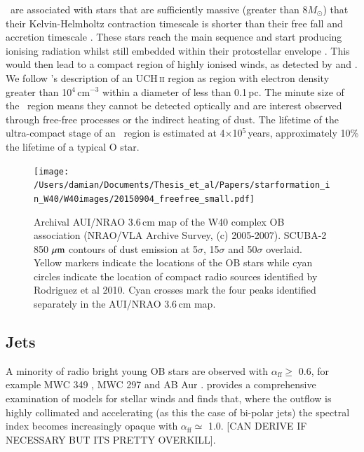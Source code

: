 \UCHII\ are associated with stars that are sufficiently massive (greater than 8$M_{\mathrm{\odot}}$) that their Kelvin-Helmholtz contraction timescale is shorter than their free fall and accretion timescale \citep{Manoj:2007ly}. These stars reach the main sequence and start producing ionising radiation whilst still embedded within their protostellar envelope \citep{McKee:2003ys}. This would then lead to a compact region of highly ionised winds, as detected by \cite{Malbet:2007zr} and \cite{Drew:1997qf}. We follow \cite{Wood:1989bh}'s description of an UCH\,\textsc{ii} region as region with electron density greater than 10$^{4}$\,cm$^{-3}$ within a diameter of less than 0.1\,pc. The minute size of the \UCHII\ region means they cannot be detected optically and are interest observed through free-free processes or the indirect heating of dust. The lifetime of the ultra-compact stage of an \HII\ region is estimated at 4$\times$10$^{5}$\,years, approximately 10\% the lifetime of a typical O star. 

\begin{figure}
\begin{centering}
\texttt{[image: /Users/damian/Documents/Thesis\_et\_al/Papers/starformation\_in\_W40/W40images/20150904\_freefree\_small.pdf]}
\caption{Archival AUI/NRAO 3.6\,cm map of the W40 complex OB association (NRAO/VLA Archive Survey, (c) 2005-2007). SCUBA-2 850\,$\,\mu\rm{m}$ contours of dust emission at 5$\sigma$, 15$\sigma$ and 50$\sigma$ overlaid. Yellow markers indicate the locations of the OB stars while cyan circles indicate the location of compact radio sources identified by Rodriguez et al 2010. Cyan crosses mark the four peaks identified separately in the AUI/NRAO 3.6\,cm map.}
\label{fig:3_6cm}
\end{centering}
\end{figure} 


\subsection{Jets}

A minority of radio bright young OB stars are observed with $\alpha_{\mathrm{ff}} \geq$ 0.6, for example MWC 349 \citep{Olnon:1975bh}, MWC 297 \cite{Skinner:1993bh, Sandell:2011dz} and AB Aur \citep{Rodriguez:2014zr}.
\cite{Reynolds:1986cr} provides a comprehensive examination of models for stellar winds and finds that, where the outflow is highly collimated and accelerating (as this the case of bi-polar jets) the spectral index becomes increasingly opaque with $\alpha_\mathrm{ff} \simeq$ 1.0. [CAN DERIVE IF NECESSARY BUT ITS PRETTY OVERKILL].

